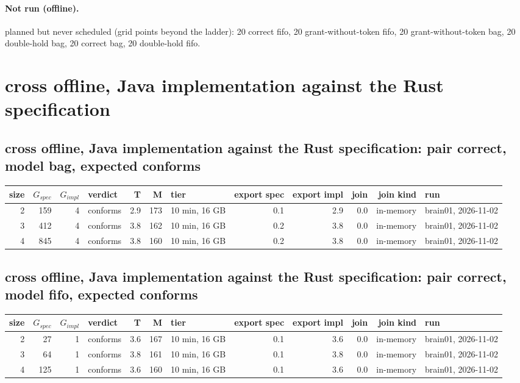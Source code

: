 \documentclass[10pt]{article}
\begin{document}
\paragraph{Not run (offline).}
planned but never scheduled (grid points beyond the ladder): 20 correct fifo, 20 grant-without-token fifo, 20 grant-without-token bag, 20 double-hold bag, 20 correct bag, 20 double-hold fifo.\par
\section*{cross offline, Java implementation against the Rust specification}
\subsection*{cross offline, Java implementation against the Rust specification: pair \textsf{correct}, model bag, expected conforms}
\begin{longtable}{@{}rrrlrrlrrrrl@{}}
\toprule
size & $G_{\mathit{spec}}$ & $G_{\mathit{impl}}$ & verdict & T & M & tier & export spec & export impl & join & join kind & run \\
\midrule
\endhead
\color{red} 2 & 159 & 4 & conforms & 2.9 & 173 & 10 min, 16 GB & 0.1 & 2.9 & 0.0 & in-memory & brain01, 2026-11-02 \\
\color{red} 3 & 412 & 4 & conforms & 3.8 & 162 & 10 min, 16 GB & 0.2 & 3.8 & 0.0 & in-memory & brain01, 2026-11-02 \\
\color{red} 4 & 845 & 4 & conforms & 3.8 & 160 & 10 min, 16 GB & 0.2 & 3.8 & 0.0 & in-memory & brain01, 2026-11-02 \\
\bottomrule
\end{longtable}
\subsection*{cross offline, Java implementation against the Rust specification: pair \textsf{correct}, model fifo, expected conforms}
\begin{longtable}{@{}rrrlrrlrrrrl@{}}
\toprule
size & $G_{\mathit{spec}}$ & $G_{\mathit{impl}}$ & verdict & T & M & tier & export spec & export impl & join & join kind & run \\
\midrule
\endhead
\color{red} 2 & 27 & 1 & conforms & 3.6 & 167 & 10 min, 16 GB & 0.1 & 3.6 & 0.0 & in-memory & brain01, 2026-11-02 \\
\color{red} 3 & 64 & 1 & conforms & 3.8 & 161 & 10 min, 16 GB & 0.1 & 3.8 & 0.0 & in-memory & brain01, 2026-11-02 \\
\color{red} 4 & 125 & 1 & conforms & 3.6 & 160 & 10 min, 16 GB & 0.1 & 3.6 & 0.0 & in-memory & brain01, 2026-11-02 \\
\bottomrule
\end{longtable}
\end{document}
